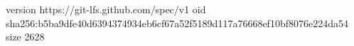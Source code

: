 version https://git-lfs.github.com/spec/v1
oid sha256:b5ba9dfe40d6394374934eb6cf67a52f5189d117a76668ef10bf8076e224da54
size 2628
